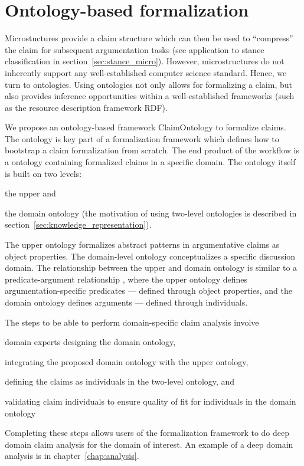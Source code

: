 \section{Ontology-based formalization}
\label{sec:ontology_formalization}

Microstuctures provide a claim structure which can then be used 
to ``compress'' the claim for subsequent argumentation tasks
(see application to stance classification in section~\ref{sec:stance_micro}).
However, microstructures do not inherently support any
well-established computer science standard. 
Hence, we turn to ontologies. Using ontologies not only allows for 
formalizing a claim, but also provides inference opportunities within
a well-established frameworks (such as the resource description framework RDF). 

We propose an ontology-based framework ClaimOntology to  formalize claims. The
ontology is key part of a formalization framework which defines how to
bootstrap a claim formalization from scratch. The end product of the workflow
is a ontology containing formalized claims in a specific domain. 
The ontology itself is built on two levels: 
\begin{enumerate*}[label=(\arabic*)]
\item the upper and 
\item the domain ontology 
(the motivation of using two-level ontologies is described in
		section~\ref{sec:knowledge_representation}). 
\end{enumerate*}
The upper ontology formalizes abstract patterns in argumentative
claims as object properties. The domain-level ontology conceptualizes 
a specific discussion domain. The relationship between the upper 
and domain ontology is similar to a predicate-argument
relationship \citep{hindle1990noun}, where the upper ontology
defines argumentation-specific predicates --- defined through object properties, 
and the domain ontology defines arguments --- defined through 
individuals. 

The steps to be able to perform domain-specific claim analysis
involve
\begin{enumerate*}[label=(\arabic*)]
\item domain experts designing the domain ontology,
\item integrating the proposed domain ontology with the upper ontology,
\item defining the claims as individuals in the two-level ontology, and
\item validating claim individuals to ensure quality of fit for
	individuals in the domain ontology
\end{enumerate*}
Completing these steps allows users of the formalization framework
to do deep domain claim analysis for the domain of interest. 
An example of a deep domain analysis is in chapter~\ref{chap:analysis}.

